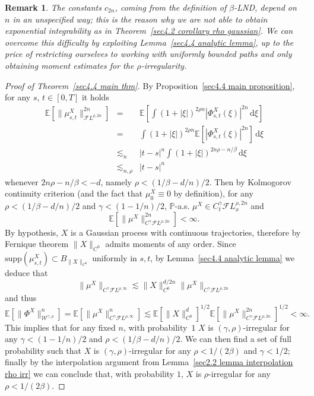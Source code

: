 \documentclass[10pt]{article}
\newcommand{\mathd}{\mathrm{d}}
\newtheorem{remark}[theorem]{Remark}
\begin{document}
\begin{remark}
  \label{rem:LND-constants}The constants $c_{2 n}$, coming from the definition
  of $\beta$\mbox{-}LND, depend on $n$ in an unspecified way; this is the
  reason why we are not able to obtain exponential integrability as in
  Theorem~\ref{sec4.2 corollary rho gaussian}. We can overcome this difficulty
  by exploiting Lemma~\ref{sec4.4 analytic lemma}, up to the price of
  restricting ourselves to working with uniformly bounded paths and only
  obtaining moment estimates for the $\rho$\mbox{-}irregularity.
\end{remark}

\begin{proof}[Proof of Theorem~\ref{sec4.4 main thm}]
  By Proposition~\ref{sec4.4 main proposition}, for any $s$, $t \in [0, T]$ it
  holds
  \begin{eqnarray*}
    \mathbb{E} [\| \mu_{s, t}^X \|_{\mathcal{F} L^{\rho, 2 n}}^{2 n}] & = &
    \mathbb{E} \left[ \int (1 + | \xi |)^{2 \rho n} | \Phi^X_{s, t} (\xi) |^{2
    n} \, \mathd \xi \right]\\
    & = & \int (1 + | \xi |)^{2 \rho n} \mathbb{E} [| \Phi^X_{s, t} (\xi)
    |^{2 n}] \, \mathd \xi\\
    & \lesssim_n & | t - s |^n \int (1 + | \xi |)^{2 n \rho - n / \beta} \,
    \mathd \xi\\
    & \lesssim_{n, \rho} & | t - s |^n
  \end{eqnarray*}
  whenever $2 n \rho - n / \beta < - d$, namely $\rho < (1 / \beta - d / n) /
  2$. Then by Kolmogorov continuity criterion (and the fact that $\mu_0^X
  \equiv 0$ by definition), for any $\rho < (1 / \beta - d / n) / 2$ and
  $\gamma < (1 - 1 / n) / 2$, $\mathbb{P}$-a.s. $\mu^X \in C^{\gamma}_t
  \mathcal{F} L^{\rho, 2 n}_x$ and
  \[ \mathbb{E} [\| \mu^X \|^{2 n}_{C^{\gamma} \mathcal{F} L^{\rho, 2 n}}] <
     \infty . \]
  By hypothesis, $X$ is a Gaussian process with continuous trajectories,
  therefore by Fernique theorem $\| X \|_{C^0}$ admits moments of any order.
  Since $\text{supp} (\mu^X_{s, t}) \subset B_{\| X \|_{C^0}}$
  uniformly in $s, t$, by Lemma~\ref{sec4.4 analytic lemma} we deduce that
  \[ \| \mu^X \|_{C^{\gamma} \mathcal{F} L^{\rho, \infty}} \lesssim \| X
     \|_{C^0}^{d / 2 n} \| \mu^X \|_{C^{\gamma} \mathcal{F} L^{\rho, 2 n}} \]
  and thus
  \[ \mathbb{E} [\| \Phi^X \|_{\mathcal{W}^{\gamma, \rho}}^n] =\mathbb{E} [\|
     \mu^X \|_{C^{\gamma} \mathcal{F} L^{\rho, \infty}}^n] \lesssim \mathbb{E}
     [\| X \|_{C^0}^d]^{1 / 2} \mathbb{E} [\| \mu^X \|_{C^{\gamma} \mathcal{F}
     L^{\rho, 2 n}}^{2 n}]^{1 / 2} < \infty . \]
  This implies that for any fixed $n$, with probability~$1$ $X$ is $(\gamma,
  \rho)$\mbox{-}irregular for any $\gamma < (1 - 1 / n) / 2$ and $\rho < (1 /
  \beta - d / n) / 2$. We can then find a set of full probability such that
  $X$ is $(\gamma, \rho)$\mbox{-}irregular for any $\rho < 1 / (2 \beta)$ and
  $\gamma < 1 / 2$; finally by the interpolation argument from
  Lemma~\ref{sec2.2 lemma interpolation rho irr} we can conclude that, with
  probability $1$, $X$ is $\rho$\mbox{-}irregular for any $\rho < 1 / (2
  \beta)$.
\end{proof}
\end{document}
